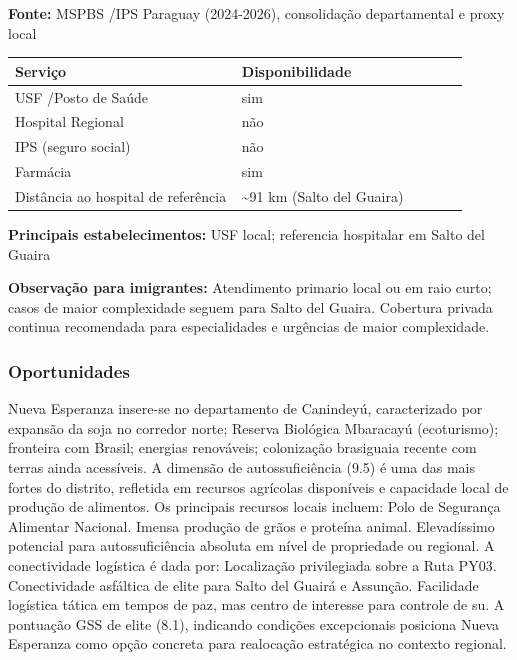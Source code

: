 \textbf{Fonte:} MSPBS /\allowbreak  IPS Paraguay (2024-2026), consolidação
departamental e proxy local

{\def\LTcaptype{none} %
\begin{longtable}{@{}>{\raggedright\arraybackslash}p{0.45\linewidth} >{\raggedright\arraybackslash}p{0.45\linewidth}@{}}
\toprule\noalign{}
Serviço & Disponibilidade \\
\midrule\noalign{}
\endhead
\bottomrule\noalign{}
\endlastfoot
USF /\allowbreak  Posto de Saúde & sim \\
Hospital Regional & não \\
IPS (seguro social) & não \\
Farmácia & sim \\
Distância ao hospital de referência & \textasciitilde91 km (Salto del
Guaira) \\
\end{longtable}
}

\textbf{Principais estabelecimentos:} USF local; referencia hospitalar
em Salto del Guaira

\textbf{Observação para imigrantes:} Atendimento primario local ou em
raio curto; casos de maior complexidade seguem para Salto del Guaira.
Cobertura privada continua recomendada para especialidades e urgências
de maior complexidade.
\newpage

\subsubsection*{Oportunidades}\label{oport-nueva-esperanza-1410}
Nueva Esperanza insere-se no departamento de Canindeyú, caracterizado por expansão da soja no corredor norte; Reserva Biológica Mbaracayú (ecoturismo); fronteira com Brasil; energias renováveis; colonização brasiguaia recente com terras ainda acessíveis. A dimensão de autossuficiência (9.5) é uma das mais fortes do distrito, refletida em recursos agrícolas disponíveis e capacidade local de produção de alimentos. Os principais recursos locais incluem: Polo de Segurança Alimentar Nacional. Imensa produção de grãos e proteína animal. Elevadíssimo potencial para autossuficiência absoluta em nível de propriedade ou regional. A conectividade logística é dada por: Localização privilegiada sobre a Ruta PY03. Conectividade asfáltica de elite para Salto del Guairá e Assunção. Facilidade logística tática em tempos de paz, mas centro de interesse para controle de su. A pontuação GSS de elite (8.1), indicando condições excepcionais posiciona Nueva Esperanza como opção concreta para realocação estratégica no contexto regional.

